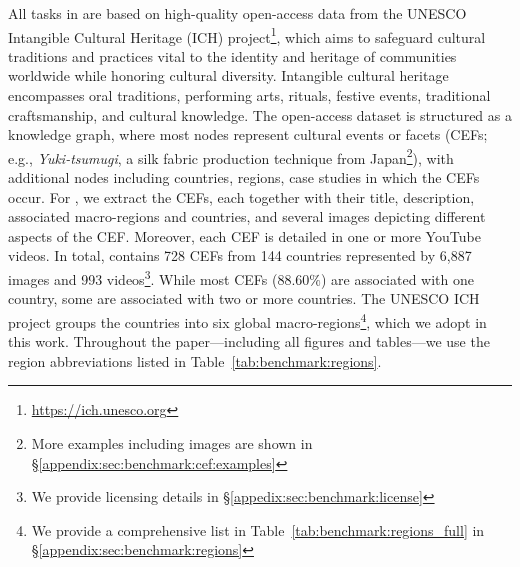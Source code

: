 \label{sec:benchmark:datasource}
%
All tasks in \dsname are based on high-quality open-access data from the UNESCO Intangible Cultural Heritage (ICH) project\footnote{\url{https://ich.unesco.org}}, which aims to safeguard cultural traditions and practices vital to the identity and heritage of communities worldwide while honoring cultural diversity.%
%
Intangible cultural heritage encompasses oral traditions, performing arts, rituals, festive events, traditional craftsmanship, and cultural knowledge.
%
The open-access dataset is structured as a knowledge graph, where most nodes represent cultural events or facets (CEFs; e.g., \emph{Yuki-tsumugi}, a silk fabric production technique from Japan\footnote{More examples including images are shown in \S\ref{appendix:sec:benchmark:cef:examples}}), with additional nodes including countries, regions, case studies in which the CEFs occur.
%
%
%
For \dsname, we extract the CEFs, each together with their title, description, associated macro-regions and countries, and several images depicting different aspects of the CEF.
%
Moreover, each CEF is detailed in one or more YouTube videos.
In total, \dsname contains 728 CEFs from 144 countries represented by 6,887 images and 993 videos\footnote{We provide licensing details in \S\ref{appedix:sec:benchmark:license}}.
%
While most CEFs ($88.60\%$) are associated with one country, some are associated with two or more countries.%
%
The UNESCO ICH project groups the countries into six global macro-regions\footnote{We provide a comprehensive list in Table~\ref{tab:benchmark:regions_full} in \S\ref{appendix:sec:benchmark:regions}}, which we adopt in this work. Throughout the paper---including all figures and tables---we use the region abbreviations listed in Table~\ref{tab:benchmark:regions}.
%
